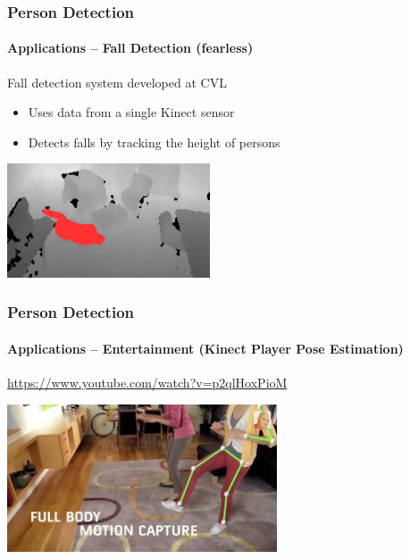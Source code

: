 \documentclass[xetex,professionalfont]{beamer}
\begin{document}
\begin{frame}
\frametitle{Person Detection}
\framesubtitle{Applications -- Fall Detection (fearless)}

Fall detection system developed at CVL
\begin{itemize}
	\item Uses data from a single Kinect sensor
    \item Detects falls by tracking the height of persons
\end{itemize}

\bigskip
\begin{center}
    \includegraphics[width=6cm]{figures/fearless-screenshot.jpg}
\end{center}

\end{frame}


\begin{frame}
\frametitle{Person Detection}
\framesubtitle{Applications -- Entertainment (Kinect Player Pose Estimation)}

\begin{center}
    \url{https://www.youtube.com/watch?v=p2qlHoxPioM}
\end{center}

\begin{center}
    \includegraphics[width=8cm]{figures/kinect-promo.jpg}
\end{center}

\end{frame}

\end{document}
